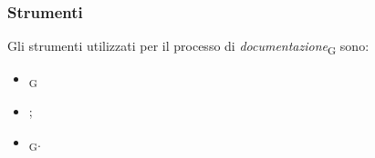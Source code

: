 \subsubsection{Strumenti}
Gli strumenti utilizzati per il processo di \textit{documentazione}\textsubscript{G} sono:
\begin{itemize}
    \item \textit{}\textsubscript{G}
    \item {};
    \item \textit{}\textsubscript{G}.
\end{itemize}